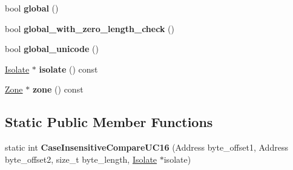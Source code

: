 \begin{DoxyCompactItemize}
\item 
bool {\bfseries global} ()\hypertarget{classv8_1_1internal_1_1_reg_exp_macro_assembler_aa5d11940ad624a215a8706d01573ca22}{}\label{classv8_1_1internal_1_1_reg_exp_macro_assembler_aa5d11940ad624a215a8706d01573ca22}

\item 
bool {\bfseries global\+\_\+with\+\_\+zero\+\_\+length\+\_\+check} ()\hypertarget{classv8_1_1internal_1_1_reg_exp_macro_assembler_ab5f358d7a47b7993cc9cf8160836acd5}{}\label{classv8_1_1internal_1_1_reg_exp_macro_assembler_ab5f358d7a47b7993cc9cf8160836acd5}

\item 
bool {\bfseries global\+\_\+unicode} ()\hypertarget{classv8_1_1internal_1_1_reg_exp_macro_assembler_a49f5c3d17a70dfc99a0a46c2cfce0ef9}{}\label{classv8_1_1internal_1_1_reg_exp_macro_assembler_a49f5c3d17a70dfc99a0a46c2cfce0ef9}

\item 
\hyperlink{classv8_1_1internal_1_1_isolate}{Isolate} $\ast$ {\bfseries isolate} () const \hypertarget{classv8_1_1internal_1_1_reg_exp_macro_assembler_a4a0b67d793689b4368f295a049bc125d}{}\label{classv8_1_1internal_1_1_reg_exp_macro_assembler_a4a0b67d793689b4368f295a049bc125d}

\item 
\hyperlink{classv8_1_1internal_1_1_zone}{Zone} $\ast$ {\bfseries zone} () const \hypertarget{classv8_1_1internal_1_1_reg_exp_macro_assembler_a5f6f5aa8bc536e716a0c316036df5742}{}\label{classv8_1_1internal_1_1_reg_exp_macro_assembler_a5f6f5aa8bc536e716a0c316036df5742}

\end{DoxyCompactItemize}
\subsection*{Static Public Member Functions}
\begin{DoxyCompactItemize}
\item 
static int {\bfseries Case\+Insensitive\+Compare\+U\+C16} (Address byte\+\_\+offset1, Address byte\+\_\+offset2, size\+\_\+t byte\+\_\+length, \hyperlink{classv8_1_1internal_1_1_isolate}{Isolate} $\ast$isolate)\hypertarget{classv8_1_1internal_1_1_reg_exp_macro_assembler_ae69f86f4af77ac94c6b6570704f37d89}{}\label{classv8_1_1internal_1_1_reg_exp_macro_assembler_ae69f86f4af77ac94c6b6570704f37d89}

\end{DoxyCompactItemize}
